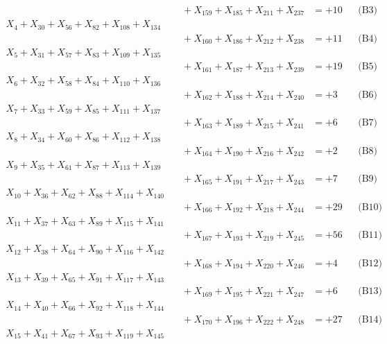 \documentclass[a4paper,10pt]{article}
\begin{document}
{\begin{align}
&\quad  + X_{159} + X_{185} + X_{211} + X_{237} &= +10 && \text{(B3)} \\
X_{4} + X_{30} + X_{56} + X_{82} + X_{108} + X_{134} \\[0.1ex]
&\quad  + X_{160} + X_{186} + X_{212} + X_{238} &= +11 && \text{(B4)} \\
\allowbreak
X_{5} + X_{31} + X_{57} + X_{83} + X_{109} + X_{135} \\[0.1ex]
&\quad  + X_{161} + X_{187} + X_{213} + X_{239} &= +19 && \text{(B5)} \\
X_{6} + X_{32} + X_{58} + X_{84} + X_{110} + X_{136} \\[0.1ex]
&\quad  + X_{162} + X_{188} + X_{214} + X_{240} &= +3 && \text{(B6)} \\
X_{7} + X_{33} + X_{59} + X_{85} + X_{111} + X_{137} \\[0.1ex]
&\quad  + X_{163} + X_{189} + X_{215} + X_{241} &= +6 && \text{(B7)} \\
X_{8} + X_{34} + X_{60} + X_{86} + X_{112} + X_{138} \\[0.1ex]
&\quad  + X_{164} + X_{190} + X_{216} + X_{242} &= +2 && \text{(B8)} \\
X_{9} + X_{35} + X_{61} + X_{87} + X_{113} + X_{139} \\[0.1ex]
&\quad  + X_{165} + X_{191} + X_{217} + X_{243} &= +7 && \text{(B9)} \\
\allowbreak
X_{10} + X_{36} + X_{62} + X_{88} + X_{114} + X_{140} \\[0.1ex]
&\quad  + X_{166} + X_{192} + X_{218} + X_{244} &= +29 && \text{(B10)} \\
X_{11} + X_{37} + X_{63} + X_{89} + X_{115} + X_{141} \\[0.1ex]
&\quad  + X_{167} + X_{193} + X_{219} + X_{245} &= +56 && \text{(B11)} \\
X_{12} + X_{38} + X_{64} + X_{90} + X_{116} + X_{142} \\[0.1ex]
&\quad  + X_{168} + X_{194} + X_{220} + X_{246} &= +4 && \text{(B12)} \\
X_{13} + X_{39} + X_{65} + X_{91} + X_{117} + X_{143} \\[0.1ex]
&\quad  + X_{169} + X_{195} + X_{221} + X_{247} &= +6 && \text{(B13)} \\
X_{14} + X_{40} + X_{66} + X_{92} + X_{118} + X_{144} \\[0.1ex]
&\quad  + X_{170} + X_{196} + X_{222} + X_{248} &= +27 && \text{(B14)} \\
\allowbreak
X_{15} + X_{41} + X_{67} + X_{93} + X_{119} + X_{145} \\[0.1ex]

\end{align}}
\end{document}
